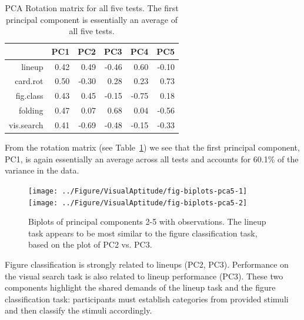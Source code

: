 \documentclass[11pt]{isuthesis}\usepackage[]{graphicx}\usepackage[]{color}
\newenvironment{knitrout}{}{} %
\begin{document}
\begin{table}[ht]
\centering
\caption{PCA Rotation matrix for all five tests. The first principal component is essentially an average of all five tests. 
             \label{tab:PCArotation5}} 
\begin{tabular}{rrrrrr}
  \hline
 & PC1 & PC2 & PC3 & PC4 & PC5 \\ 
  \hline
lineup & 0.42 & 0.49 & -0.46 & 0.60 & -0.10 \\ 
  card.rot & 0.50 & -0.30 & 0.28 & 0.23 & 0.73 \\ 
  fig.class & 0.43 & 0.45 & -0.15 & -0.75 & 0.18 \\ 
  folding & 0.47 & 0.07 & 0.68 & 0.04 & -0.56 \\ 
  vis.search & 0.41 & -0.69 & -0.48 & -0.15 & -0.33 \\ 
   \hline
\end{tabular}
\end{table}

From the rotation matrix (see Table~\ref{tab:PCArotation5}) we see that  
the first principal component, PC1, is again essentially an average across all tests and accounts for 60.1\% of the variance in the data. 

\begin{knitrout}
\color{fgcolor}\begin{figure}

{\centering \texttt{[image: ../Figure/VisualAptitude/fig-biplots-pca5-1]} 
\texttt{[image: ../Figure/VisualAptitude/fig-biplots-pca5-2]} 

}

\caption{Biplots of principal components 2-5 with observations. The lineup task appears to be most similar to the figure classification task, based on the plot of PC2 vs. PC3.  \label{fig:biplots5}}\label{fig:biplots-pca5}
\end{figure}


\end{knitrout}

Figure classification is strongly related to lineups (PC2, PC3). Performance on the visual search task  is also related to lineup performance (PC3). These two components highlight the shared demands of the lineup task and the figure classification task: participants must establish categories from provided stimuli and then classify the stimuli accordingly. 
\end{document}
